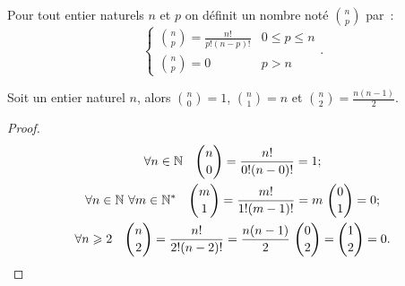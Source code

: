 \begin{defdef}
  Pour tout entier naturels \(n\) et \(p\) on définit un nombre noté \(\binom{n}{p}\) par~:
  \begin{equation}
    \begin{cases}
      \binom{n}{p}=\frac{n!}{p!(n-p)!} & 0\leqslant p \leqslant n \\
      \binom{n}{p}=0 & p > n
    \end{cases}.
  \end{equation}
\end{defdef}
\begin{prop}
  Soit un entier naturel \(n\), alors \(\binom{n}{0}=1\), \(\binom{n}{1}=n\) et \(\binom{n}{2}=\frac{n(n-1)}{2}\).
\end{prop}
\begin{proof}
  \begin{gather}
    \forall n \in \N \quad \binom{n}{0}=\frac{n!}{0!(n-0)!}=1; \\
    \forall n \in \N \ \forall m\in \N^* \quad \binom{m}{1}=\frac{m!}{1!(m-1)!}=m \ \binom{0}{1}=0;\\
    \forall n \geqslant 2 \quad \binom{n}{2}=\frac{n!}{2!(n-2)!}=\frac{n(n-1)}{2} \ \binom{0}{2}=\binom{1}{2}=0.
  \end{gather}
\end{proof}
